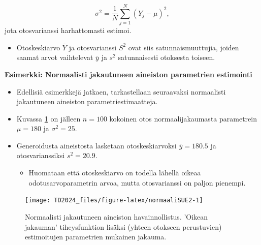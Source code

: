 \documentclass[
]{book}
\providecommand{\tightlist}{%
  \setlength{\itemsep}{0pt}\setlength{\parskip}{0pt}}
\begin{document}
\[
\sigma^2= \frac{1}{N} \sum_{j=1}^{N} (Y_j - \mu)^2,
\]
jota otosvarianssi harhattomasti estimoi.

\begin{itemize}
\tightlist
\item
  Otoskeskiarvo \(\bar{Y}\) ja otosvarianssi \(S^2\) ovat siis satunnaismuuttujia, joiden saamat arvot vaihtelevat \(\bar{y}\) ja \(s^2\) satunnaisesti otoksesta toiseen.
\end{itemize}

\begin{eblock}{}

\textbf{Esimerkki: Normaalisti jakautuneen aineiston parametrien estimointi}

\begin{itemize}
\tightlist
\item
  Edellisiä esimerkkejä jatkaen, tarkastellaan seuraavaksi normaalisti jakautuneen aineiston parametriestimaatteja.
\item
  Kuvassa \ref{fig:normaaliSUE2} on jälleen \(n=100\) kokoinen otos normaalijakaumasta parametrein \(\mu = 180\) ja \(\sigma^2 = 25\).\\
\item
  Generoidusta aineistosta lasketaan otoskeskiarvoksi \(\bar{y} = 180.5\) ja otosvarianssiksi \(s^2 = 20.9\).

  \begin{itemize}
  \tightlist
  \item
    Huomataan että otoskeskiarvo on todella lähellä oikeaa odotusarvoparametrin arvoa, mutta otosvarianssi on paljon pienempi.
  \end{itemize}
\end{itemize}

\end{eblock}

\FloatBarrier
\begin{figure}

{\centering \texttt{[image: TD2024\_files/figure-latex/normaaliSUE2-1]} 

}

\caption{Normaalisti jakautuneen aineiston havainnollistus. 'Oikean jakauman' tiheysfunktion lisäksi (yhteen otokseen perustuvien) estimoitujen parametrien mukainen jakauma.}\label{fig:normaaliSUE2}
\end{figure}
\FloatBarrier
\end{document}

